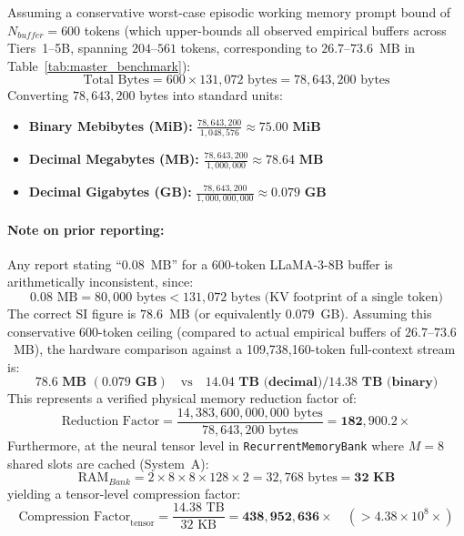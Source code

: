 \documentclass[11pt,a4paper]{article}
\begin{document}
Assuming a conservative worst-case episodic working memory prompt bound of $N_{buffer} = 600$ tokens (which upper-bounds all observed empirical buffers across Tiers~1--5B, spanning $204$--$561$ tokens, corresponding to $26.7$--$73.6$~MB in Table~\ref{tab:master_benchmark}):
\begin{equation}
\text{Total Bytes} = 600 \times 131,072 \text{ bytes} = 78,643,200 \text{ bytes}
\end{equation}
Converting $78,643,200$ bytes into standard units:
\begin{itemize}
    \item \textbf{Binary Mebibytes (MiB):} $\frac{78,643,200}{1,048,576} \approx \mathbf{75.00 \text{ MiB}}$
    \item \textbf{Decimal Megabytes (MB):} $\frac{78,643,200}{1,000,000} \approx \mathbf{78.64 \text{ MB}}$
    \item \textbf{Decimal Gigabytes (GB):} $\frac{78,643,200}{1,000,000,000} \approx \mathbf{0.079 \text{ GB}}$
\end{itemize}

\paragraph{Note on prior reporting:} Any report stating ``$0.08$~MB'' for a 600-token LLaMA-3-8B buffer is arithmetically inconsistent, since:
\begin{equation}
0.08 \text{ MB} = 80,000 \text{ bytes} < 131,072 \text{ bytes (KV footprint of a single token)}
\end{equation}
The correct SI figure is $78.6$~MB (or equivalently $0.079$~GB). Assuming this conservative 600-token ceiling (compared to actual empirical buffers of $26.7$--$73.6$~MB), the hardware comparison against a 109,738,160-token full-context stream is:
\begin{equation}
\mathbf{78.6\text{ MB } (0.079\text{ GB})} \quad \text{vs} \quad \mathbf{14.04\text{ TB (decimal)} / 14.38\text{ TB (binary)}}
\end{equation}
This represents a verified physical memory reduction factor of:
\begin{equation}
\text{Reduction Factor} = \frac{14,383,600,000,000 \text{ bytes}}{78,643,200 \text{ bytes}} = \mathbf{182,900.2 \times}
\end{equation}
Furthermore, at the neural tensor level in \texttt{RecurrentMemoryBank} where $M = 8$ shared slots are cached (System~A):
\begin{equation}
\text{RAM}_{Bank} = 2 \times 8 \times 8 \times 128 \times 2 = 32,768 \text{ bytes} = \mathbf{32 \text{ KB}}
\end{equation}
yielding a tensor-level compression factor:
\begin{equation}
\text{Compression Factor}_{\text{tensor}} = \frac{14.38\text{ TB}}{32\text{ KB}} = \mathbf{438,952,636 \times} \quad (>4.38 \times 10^8 \times)
\end{equation}
\end{document}
